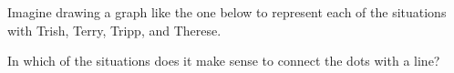 \documentclass[nooutcomes]{ximera}
\begin{document}
\begin{problem}
Imagine drawing a graph like the one below to represent each of the situations with Trish, Terry, Tripp, and Therese.

\begin{center}
\end{center}

In which of the situations does it make sense to connect the dots with a line?
\begin{selectAll}
\end{selectAll}




\end{problem}
\end{document}
